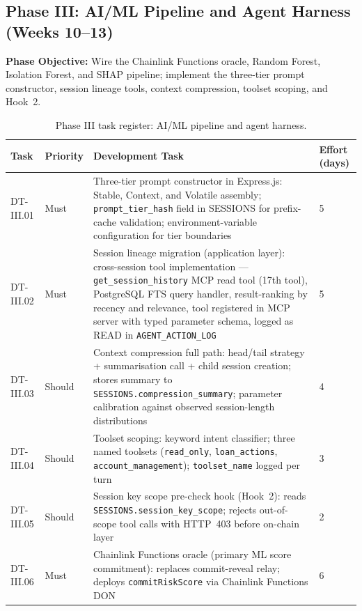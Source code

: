 \documentclass[12pt,a4paper]{report}
\begin{document}
\subsection{Phase III: AI/ML Pipeline and Agent Harness (Weeks 10--13)}

\textbf{Phase Objective:} Wire the Chainlink Functions oracle, Random Forest,
Isolation Forest, and SHAP pipeline; implement the three-tier prompt constructor,
session lineage tools, context compression, toolset scoping, and Hook~2.

\begin{table}[H]
\centering
\caption{Phase III task register: AI/ML pipeline and agent harness.}
\label{tab:phaseIII}
\small
\begin{tabular}{p{1.8cm}p{1.8cm}p{7.5cm}p{1.5cm}}
\hline
\textbf{Task} & \textbf{Priority} & \textbf{Development Task} & \textbf{Effort (days)} \\
\hline
DT-III.01 & Must & Three-tier prompt constructor in Express.js: Stable, Context, and Volatile assembly; \texttt{prompt\_tier\_hash} field in SESSIONS for prefix-cache validation; environment-variable configuration for tier boundaries & 5 \\
\hline
DT-III.02 & Must & Session lineage migration (application layer): cross-session tool implementation --- \texttt{get\_session\_history} MCP read tool (17th tool), PostgreSQL FTS query handler, result-ranking by recency and relevance, tool registered in MCP server with typed parameter schema, logged as READ in \texttt{AGENT\_ACTION\_LOG} & 5 \\
\hline
DT-III.03 & Should & Context compression full path: head/tail strategy + summarisation call + child session creation; stores summary to \texttt{SESSIONS.compression\_summary}; parameter calibration against observed session-length distributions & 4 \\
\hline
DT-III.04 & Should & Toolset scoping: keyword intent classifier; three named toolsets (\texttt{read\_only}, \texttt{loan\_actions}, \texttt{account\_management}); \texttt{toolset\_name} logged per turn & 3 \\
\hline
DT-III.05 & Should & Session key scope pre-check hook (Hook~2): reads \texttt{SESSIONS.session\_key\_scope}; rejects out-of-scope tool calls with HTTP~403 before on-chain layer & 2 \\
\hline
DT-III.06 & Must & Chainlink Functions oracle (primary ML score commitment): replaces commit-reveal relay; deploys \texttt{commitRiskScore} via Chainlink Functions DON & 6 \\

\end{tabular}
\end{table}
\end{document}
